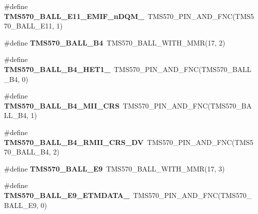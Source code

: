 \begin{DoxyCompactItemize}
\item 
\mbox{\label{tms570ls3137zwt-pins_8h_a0396be32e41c183eb964cdd56fa483e3}} 
\#define {\bfseries T\+M\+S570\+\_\+\+B\+A\+L\+L\+\_\+\+E11\+\_\+\+E\+M\+I\+F\+\_\+n\+D\+Q\+M\+\_}~T\+M\+S570\+\_\+\+P\+I\+N\+\_\+\+A\+N\+D\+\_\+\+F\+NC(T\+M\+S570\+\_\+\+B\+A\+L\+L\+\_\+\+E11, 1)
\item 
\mbox{\label{tms570ls3137zwt-pins_8h_ae136a42d7821ad27bd9a294b6d3a4e64}} 
\#define {\bfseries T\+M\+S570\+\_\+\+B\+A\+L\+L\+\_\+\+B4}~T\+M\+S570\+\_\+\+B\+A\+L\+L\+\_\+\+W\+I\+T\+H\+\_\+\+M\+MR(17, 2)
\item 
\mbox{\label{tms570ls3137zwt-pins_8h_a50b17dcdc4982823eebc83e5d2d91ad8}} 
\#define {\bfseries T\+M\+S570\+\_\+\+B\+A\+L\+L\+\_\+\+B4\+\_\+\+H\+E\+T1\+\_}~T\+M\+S570\+\_\+\+P\+I\+N\+\_\+\+A\+N\+D\+\_\+\+F\+NC(T\+M\+S570\+\_\+\+B\+A\+L\+L\+\_\+\+B4, 0)
\item 
\mbox{\label{tms570ls3137zwt-pins_8h_a48ce36f18eec38cac5ac7a7403868de3}} 
\#define {\bfseries T\+M\+S570\+\_\+\+B\+A\+L\+L\+\_\+\+B4\+\_\+\+M\+I\+I\+\_\+\+C\+RS}~T\+M\+S570\+\_\+\+P\+I\+N\+\_\+\+A\+N\+D\+\_\+\+F\+NC(T\+M\+S570\+\_\+\+B\+A\+L\+L\+\_\+\+B4, 1)
\item 
\mbox{\label{tms570ls3137zwt-pins_8h_aaa24defae7e1c36aac7f7813917ecc86}} 
\#define {\bfseries T\+M\+S570\+\_\+\+B\+A\+L\+L\+\_\+\+B4\+\_\+\+R\+M\+I\+I\+\_\+\+C\+R\+S\+\_\+\+DV}~T\+M\+S570\+\_\+\+P\+I\+N\+\_\+\+A\+N\+D\+\_\+\+F\+NC(T\+M\+S570\+\_\+\+B\+A\+L\+L\+\_\+\+B4, 2)
\item 
\mbox{\label{tms570ls3137zwt-pins_8h_aba898eac2e739d9a6e4de0a8b4988425}} 
\#define {\bfseries T\+M\+S570\+\_\+\+B\+A\+L\+L\+\_\+\+E9}~T\+M\+S570\+\_\+\+B\+A\+L\+L\+\_\+\+W\+I\+T\+H\+\_\+\+M\+MR(17, 3)
\item 
\mbox{\label{tms570ls3137zwt-pins_8h_adc6faea84af2ff9b64e51045319fbdf8}} 
\#define {\bfseries T\+M\+S570\+\_\+\+B\+A\+L\+L\+\_\+\+E9\+\_\+\+E\+T\+M\+D\+A\+T\+A\+\_}~T\+M\+S570\+\_\+\+P\+I\+N\+\_\+\+A\+N\+D\+\_\+\+F\+NC(T\+M\+S570\+\_\+\+B\+A\+L\+L\+\_\+\+E9, 0)
\item 

\end{DoxyCompactItemize}
